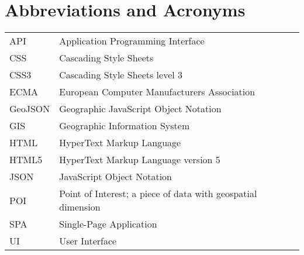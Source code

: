 
\chapter*{Abbreviations and Acronyms}


\noindent
\begin{longtable}{@{}p{}p{}@{}}
API & Application Programming Interface \\
CSS & Cascading Style Sheets \\
CSS3 & Cascading Style Sheets level 3 \\
ECMA & European Computer Manufacturers Association \\
GeoJSON & Geographic JavaScript Object Notation \\
GIS & Geographic Information System \\
HTML & HyperText Markup Language \\
HTML5 & HyperText Markup Language version 5 \\
JSON & JavaScript Object Notation \\
POI & Point of Interest; a piece of data with geospatial dimension \\
SPA & Single-Page Application \\
UI & User Interface \\

\end{longtable}
